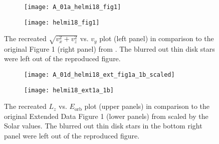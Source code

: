 \documentclass[a4paper,11pt]{article}
\begin{document}
%
\begin{figure}[H]
 \begin{minipage}{\textwidth}
 \centering
 \begin{minipage}[c]{0.4\textwidth}
 \begin{subfigure}[b]{\linewidth}
  \centering
  \texttt{[image: A\_01a\_helmi18\_fig1]}
 \end{subfigure}
 \end{minipage}
 \begin{minipage}[c]{0.4\textwidth}
 \begin{subfigure}[b]{\linewidth}
  \centering
  \texttt{[image: helmi18\_fig1]}
 \end{subfigure}
 \end{minipage}
 \caption[Reproduction of Helmi et al. (2018) velocity plot]{The recreated $\sqrt{v_x^2+v_z^2}$ vs. $v_y$ plot (left panel) in comparison to the original Figure 1 (right panel) from \citet{helmi18}. The blurred out thin disk stars were left out of the reproduced figure.}
 \label{fig:helmi18_fig1}
 \end{minipage}\vspace{0.5cm}
 \begin{minipage}{\textwidth}
 \centering
 \begin{subfigure}[t]{0.75\textwidth}
  \texttt{[image: A\_01d\_helmi18\_ext\_fig1a\_1b\_scaled]}
 \end{subfigure}
 \medskip
 \begin{subfigure}[t]{0.75\textwidth}
  \texttt{[image: helmi18\_ext1a\_1b]}
 \end{subfigure}
 \caption[Reproduction of Helmi et al. (2018) $L_z$--$E_\mathrm{orb}$-plot]{The recreated $L_z$ vs. $E_\mathrm{orb}$ plot (upper panels) in comparison to the original Extended Data Figure 1 (lower panels) from \citet{helmi18} scaled by the Solar values. The blurred out thin disk stars in the bottom right panel were left out of the reproduced figure.}
 \label{fig:helmi18_ext_fig1}
 \end{minipage}
\end{figure}
%
\clearpage
\end{document}
